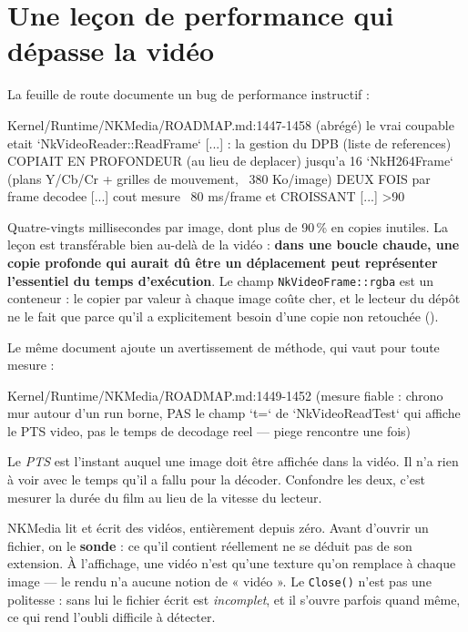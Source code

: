 \section{Une leçon de performance qui dépasse la vidéo}

La feuille de route documente un bug de performance instructif :

\begin{nkcode}{Kernel/Runtime/NKMedia/ROADMAP.md:1447-1458 (abrégé)}
 le vrai coupable etait `NkVideoReader::ReadFrame` [...] : la gestion du DPB (liste de
 references) COPIAIT EN PROFONDEUR (au lieu de deplacer) jusqu'a 16 `NkH264Frame`
 (plans Y/Cb/Cr + grilles de mouvement, ~380 Ko/image) DEUX FOIS par frame decodee
 [...] cout mesure ~80 ms/frame et CROISSANT [...] >90%
\end{nkcode}

Quatre-vingts millisecondes par image, dont plus de 90\,\% en copies inutiles.
La leçon est transférable bien au-delà de la vidéo : \textbf{dans une boucle
chaude, une copie profonde qui aurait dû être un déplacement peut représenter
l'essentiel du temps d'exécution}. Le champ \texttt{NkVideoFrame::rgba} est un
conteneur : le copier par valeur à chaque image coûte cher, et le lecteur du
dépôt ne le fait que parce qu'il a explicitement besoin d'une copie non
retouchée ().

Le même document ajoute un avertissement de méthode, qui vaut pour toute mesure :

\begin{nkcode}{Kernel/Runtime/NKMedia/ROADMAP.md:1449-1452}
 (mesure fiable : chrono mur autour d'un run borne, PAS le champ `t=` de `NkVideoReadTest`
 qui affiche le PTS video, pas le temps de decodage reel — piege rencontre une fois)
\end{nkcode}

Le \emph{PTS} est l'instant auquel une image doit être affichée dans la vidéo. Il
n'a rien à voir avec le temps qu'il a fallu pour la décoder. Confondre les deux,
c'est mesurer la durée du film au lieu de la vitesse du lecteur.

\begin{nkbilan}
NKMedia lit et écrit des vidéos, entièrement depuis zéro. Avant d'ouvrir un
fichier, on le \textbf{sonde} : ce qu'il contient réellement ne se déduit pas de
son extension. À l'affichage, une vidéo n'est qu'une texture qu'on remplace à
chaque image --- le rendu n'a aucune notion de « vidéo ». Le \texttt{Close()}
n'est pas une politesse : sans lui le fichier écrit est \emph{incomplet}, et il
s'ouvre parfois quand même, ce qui rend l'oubli difficile à détecter.
\end{nkbilan}


